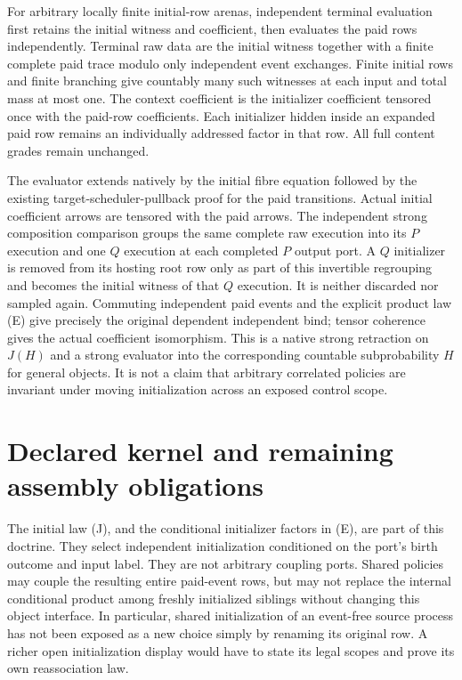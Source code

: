 \documentclass[11pt]{article}
\begin{document}
For arbitrary locally finite initial-row arenas, independent terminal evaluation first retains the initial witness and coefficient, then evaluates the paid rows independently. Terminal raw data are the initial witness together with a finite complete paid trace modulo only independent event exchanges. Finite initial rows and finite branching give countably many such witnesses at each input and total mass at most one. The context coefficient is the initializer coefficient tensored once with the paid-row coefficients. Each initializer hidden inside an expanded paid row remains an individually addressed factor in that row. All full content grades remain unchanged.

The evaluator extends natively by the initial fibre equation followed by the existing target-scheduler-pullback proof for the paid transitions. Actual initial coefficient arrows are tensored with the paid arrows. The independent strong composition comparison groups the same complete raw execution into its $P$ execution and one $Q$ execution at each completed $P$ output port. A $Q$ initializer is removed from its hosting root row only as part of this invertible regrouping and becomes the initial witness of that $Q$ execution. It is neither discarded nor sampled again. Commuting independent paid events and the explicit product law (E) give precisely the original dependent independent bind; tensor coherence gives the actual coefficient isomorphism. This is a native strong retraction on $J(H)$ and a strong evaluator into the corresponding countable subprobability $H$ for general objects. It is not a claim that arbitrary correlated policies are invariant under moving initialization across an exposed control scope.

\section{Declared kernel and remaining assembly obligations}
The initial law (J), and the conditional initializer factors in (E), are part of this doctrine. They select independent initialization conditioned on the port's birth outcome and input label. They are not arbitrary coupling ports. Shared policies may couple the resulting entire paid-event rows, but may not replace the internal conditional product among freshly initialized siblings without changing this object interface. In particular, shared initialization of an event-free source process has not been exposed as a new choice simply by renaming its original row. A richer open initialization display would have to state its legal scopes and prove its own reassociation law.
\end{document}

